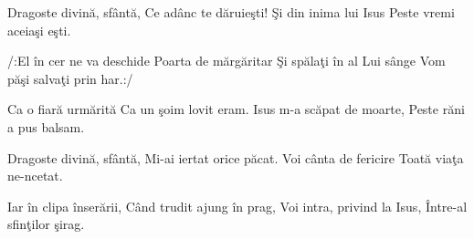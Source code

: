 
\beginverse
Dragoste divină, sfântă,
Ce adânc te dăruieşti!
Şi din inima lui Isus
Peste vremi aceiaşi eşti.
\endverse

\beginchorus
/:El în cer ne va deschide
Poarta de mărgăritar
Şi spălaţi în al Lui sânge
Vom păşi salvaţi prin har.:/
\endchorus

\beginverse
Ca o fiară urmărită
Ca un şoim lovit eram.
Isus m-a scăpat de moarte,
Peste răni a pus balsam.
\endverse

\beginverse
Dragoste divină, sfântă,
Mi-ai iertat orice păcat.
Voi cânta de fericire
Toată viaţa ne-ncetat.
\endverse

\beginverse
Iar în clipa înserării,
Când trudit ajung în prag,
Voi intra, privind la Isus,
Între-al sfinţilor şirag. 
\endverse

\endsong


